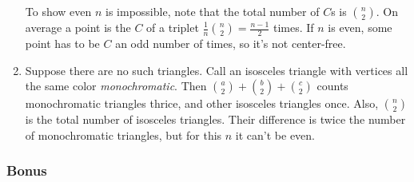 \documentclass[11pt,paper=letter]{scrartcl}
\begin{document}
\begin{enumerate}
To show even $n$ is impossible, note that the total number of $C$s is $\binom{n}{2}$. On average a point is the $C$ of a triplet $\frac{1}{n}\binom{n}{2} = \frac{n-1}{2}$ times. If $n$ is even, some point has to be $C$ an odd number of times, so it's not center-free.

\item Suppose there are no such triangles. Call an isosceles triangle with vertices all the same color \textit{monochromatic}. Then $\binom{a}{2} + \binom{b}{2} + \binom{c}{2}$ counts monochromatic triangles thrice, and other isosceles triangles once. Also, $\binom{n}{2}$ is the total number of isosceles triangles. Their difference is twice the number of monochromatic triangles, but for this $n$ it can't be even.

\end{enumerate}

\subsubsection*{Bonus}
\end{document}
